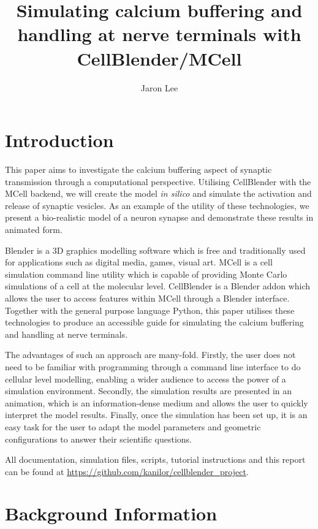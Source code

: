 \documentclass[a4paper]{article}
\title{Simulating calcium buffering and handling at nerve terminals with CellBlender/MCell}
\author{Jaron Lee}
\begin{document}
\maketitle

\section{Introduction}
This paper aims to investigate the calcium buffering aspect of synaptic transmission through a computational perspective. Utilising CellBlender with the MCell backend, we will create the model \textit{in silico} and simulate the activation and release of synaptic vesicles. As an example of the utility of these technologies, we present a bio-realistic model of a neuron synapse and demonstrate these results in animated form.

Blender is a 3D graphics modelling software which is free and traditionally used for applications such as digital media, games, visual art. MCell is a cell simulation command line utility which is capable of providing Monte Carlo simulations of a cell at the molecular level. CellBlender is a Blender addon which allows the user to access features within MCell through a Blender interface. Together with the general purpose language Python, this paper utilises these technologies to produce an accessible guide for simulating the calcium buffering and handling at nerve terminals.

The advantages of such an approach are many-fold. Firstly, the user does not need to be familiar with programming through a command line interface to do cellular level modelling, enabling a wider audience to access the power of a simulation environment. Secondly, the simulation results are presented in an animation, which is an information-dense medium and allows the user to quickly interpret the model results. Finally, once the simulation has been set up, it is an easy task for the user to adapt the model parameters and geometric configurations to answer their scientific questions. 

All documentation, simulation files, scripts, tutorial instructions and this report can be found at \url{https://github.com/kanilor/cellblender_project}.

\section{Background Information}
\end{document}
